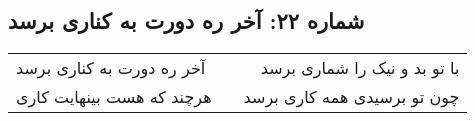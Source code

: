 \begin{center}
\section*{شماره ۲۲: آخر ره دورت به کناری برسد}
\label{sec:022}
\begin{longtable}{l p{0.5cm} r}
آخر ره دورت به کناری برسد
&&
با تو بد و نیک را شماری برسد
\\
هرچند که هست بینهایت کاری
&&
چون تو برسیدی همه کاری برسد
\\
\end{longtable}
\end{center}
